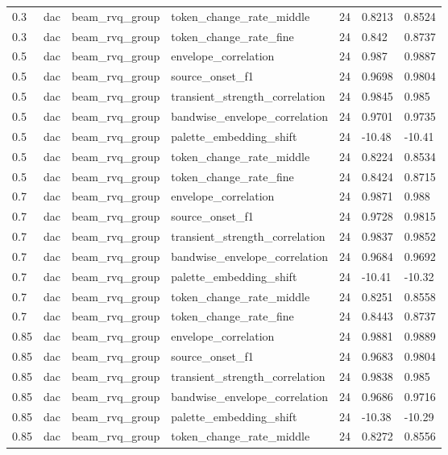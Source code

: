 \begin{table}[t]
\begin{tabular}{lllllll}
0.3 & dac & beam\_rvq\_group & token\_change\_rate\_middle & 24 & 0.8213 & 0.8524 \\
0.3 & dac & beam\_rvq\_group & token\_change\_rate\_fine & 24 & 0.842 & 0.8737 \\
0.5 & dac & beam\_rvq\_group & envelope\_correlation & 24 & 0.987 & 0.9887 \\
0.5 & dac & beam\_rvq\_group & source\_onset\_f1 & 24 & 0.9698 & 0.9804 \\
0.5 & dac & beam\_rvq\_group & transient\_strength\_correlation & 24 & 0.9845 & 0.985 \\
0.5 & dac & beam\_rvq\_group & bandwise\_envelope\_correlation & 24 & 0.9701 & 0.9735 \\
0.5 & dac & beam\_rvq\_group & palette\_embedding\_shift & 24 & -10.48 & -10.41 \\
0.5 & dac & beam\_rvq\_group & token\_change\_rate\_middle & 24 & 0.8224 & 0.8534 \\
0.5 & dac & beam\_rvq\_group & token\_change\_rate\_fine & 24 & 0.8424 & 0.8715 \\
0.7 & dac & beam\_rvq\_group & envelope\_correlation & 24 & 0.9871 & 0.988 \\
0.7 & dac & beam\_rvq\_group & source\_onset\_f1 & 24 & 0.9728 & 0.9815 \\
0.7 & dac & beam\_rvq\_group & transient\_strength\_correlation & 24 & 0.9837 & 0.9852 \\
0.7 & dac & beam\_rvq\_group & bandwise\_envelope\_correlation & 24 & 0.9684 & 0.9692 \\
0.7 & dac & beam\_rvq\_group & palette\_embedding\_shift & 24 & -10.41 & -10.32 \\
0.7 & dac & beam\_rvq\_group & token\_change\_rate\_middle & 24 & 0.8251 & 0.8558 \\
0.7 & dac & beam\_rvq\_group & token\_change\_rate\_fine & 24 & 0.8443 & 0.8737 \\
0.85 & dac & beam\_rvq\_group & envelope\_correlation & 24 & 0.9881 & 0.9889 \\
0.85 & dac & beam\_rvq\_group & source\_onset\_f1 & 24 & 0.9683 & 0.9804 \\
0.85 & dac & beam\_rvq\_group & transient\_strength\_correlation & 24 & 0.9838 & 0.985 \\
0.85 & dac & beam\_rvq\_group & bandwise\_envelope\_correlation & 24 & 0.9686 & 0.9716 \\
0.85 & dac & beam\_rvq\_group & palette\_embedding\_shift & 24 & -10.38 & -10.29 \\
0.85 & dac & beam\_rvq\_group & token\_change\_rate\_middle & 24 & 0.8272 & 0.8556 \\

\end{tabular}
\end{table}
